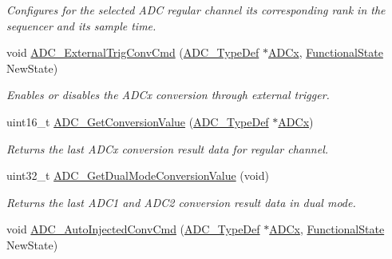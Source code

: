 \begin{DoxyCompactItemize}
\begin{DoxyCompactList}\small\item\em Configures for the selected A\+DC regular channel its corresponding rank in the sequencer and its sample time. \end{DoxyCompactList}\item 
void \mbox{\hyperlink{group___a_d_c___exported___functions_ga3ae92d7940a16c898223374a5857f509}{A\+D\+C\+\_\+\+External\+Trig\+Conv\+Cmd}} (\mbox{\hyperlink{struct_a_d_c___type_def}{A\+D\+C\+\_\+\+Type\+Def}} $\ast$\mbox{\hyperlink{group___s_t_m32_f1_x_x___n_u_c_l_e_o___l_o_w___l_e_v_e_l___exported___constants_gab44c1065d38c298955fc028346984340}{A\+D\+Cx}}, \mbox{\hyperlink{group___exported__types_gac9a7e9a35d2513ec15c3b537aaa4fba1}{Functional\+State}} New\+State)
\begin{DoxyCompactList}\small\item\em Enables or disables the A\+D\+Cx conversion through external trigger. \end{DoxyCompactList}\item 
uint16\+\_\+t \mbox{\hyperlink{group___a_d_c___exported___functions_gaaf74221c285ec5dab5e66baf7bec6bd3}{A\+D\+C\+\_\+\+Get\+Conversion\+Value}} (\mbox{\hyperlink{struct_a_d_c___type_def}{A\+D\+C\+\_\+\+Type\+Def}} $\ast$\mbox{\hyperlink{group___s_t_m32_f1_x_x___n_u_c_l_e_o___l_o_w___l_e_v_e_l___exported___constants_gab44c1065d38c298955fc028346984340}{A\+D\+Cx}})
\begin{DoxyCompactList}\small\item\em Returns the last A\+D\+Cx conversion result data for regular channel. \end{DoxyCompactList}\item 
uint32\+\_\+t \mbox{\hyperlink{group___a_d_c___exported___functions_gac5a4792dc29ef7ff6bfbce9f37e8a668}{A\+D\+C\+\_\+\+Get\+Dual\+Mode\+Conversion\+Value}} (void)
\begin{DoxyCompactList}\small\item\em Returns the last A\+D\+C1 and A\+D\+C2 conversion result data in dual mode. \end{DoxyCompactList}\item 
void \mbox{\hyperlink{group___a_d_c___exported___functions_ga1ff9c3b8e4bbdd2addfd227f1a506a66}{A\+D\+C\+\_\+\+Auto\+Injected\+Conv\+Cmd}} (\mbox{\hyperlink{struct_a_d_c___type_def}{A\+D\+C\+\_\+\+Type\+Def}} $\ast$\mbox{\hyperlink{group___s_t_m32_f1_x_x___n_u_c_l_e_o___l_o_w___l_e_v_e_l___exported___constants_gab44c1065d38c298955fc028346984340}{A\+D\+Cx}}, \mbox{\hyperlink{group___exported__types_gac9a7e9a35d2513ec15c3b537aaa4fba1}{Functional\+State}} New\+State)

\end{DoxyCompactItemize}
